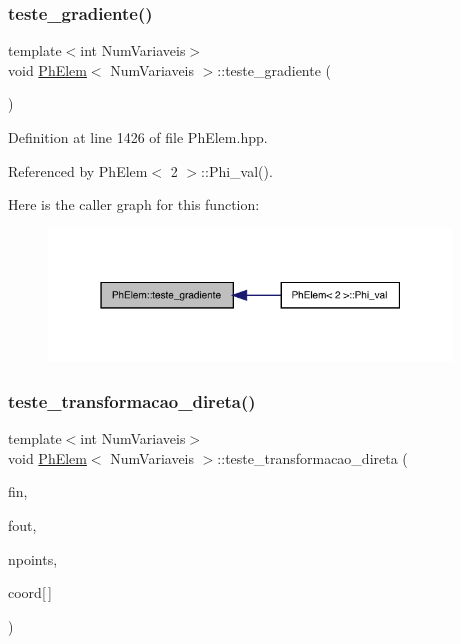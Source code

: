 \subsubsection{\texorpdfstring{teste\+\_\+gradiente()}{teste\_gradiente()}}
{\footnotesize\ttfamily template$<$int Num\+Variaveis$>$ \\
void \hyperlink{classPhElem}{Ph\+Elem}$<$ Num\+Variaveis $>$\+::teste\+\_\+gradiente (\begin{DoxyParamCaption}{ }\end{DoxyParamCaption})}



Definition at line 1426 of file Ph\+Elem.\+hpp.



Referenced by Ph\+Elem$<$ 2 $>$\+::\+Phi\+\_\+val().

Here is the caller graph for this function\+:
\nopagebreak
\begin{figure}[H]
\begin{center}
\leavevmode
\includegraphics[width=304pt]{classPhElem_adc3411d8b3a88f04004b6d48e64e9334_icgraph}
\end{center}
\end{figure}
\mbox{\label{classPhElem_a68e2ff863aa38d90933fc033e1fcec0e}} 
\subsubsection{\texorpdfstring{teste\+\_\+transformacao\+\_\+direta()}{teste\_transformacao\_direta()}}
{\footnotesize\ttfamily template$<$int Num\+Variaveis$>$ \\
void \hyperlink{classPhElem}{Ph\+Elem}$<$ Num\+Variaveis $>$\+::teste\+\_\+transformacao\+\_\+direta (\begin{DoxyParamCaption}\item[{F\+I\+LE $\ast$}]{fin,  }\item[{F\+I\+LE $\ast$}]{fout,  }\item[{const int \&}]{npoints,  }\item[{const double}]{coord\mbox{[}$\,$\mbox{]} }\end{DoxyParamCaption})}



